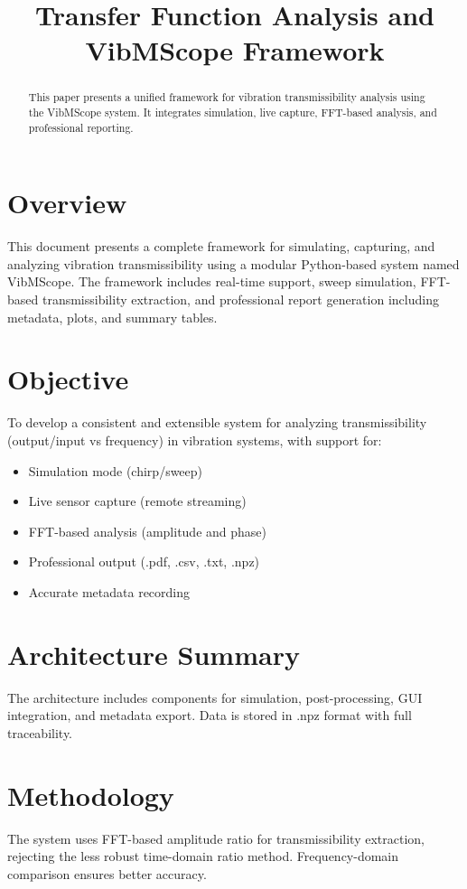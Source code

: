 \documentclass[conference]{IEEEtran}
\title{Transfer Function Analysis and VibMScope Framework}
\author{\IEEEauthorblockN{Author Name(s)}
\IEEEauthorblockA{Affiliation\\ Email}}
\begin{document}
\maketitle

\begin{abstract}
This paper presents a unified framework for vibration transmissibility analysis using the VibMScope system. It integrates simulation, live capture, FFT-based analysis, and professional reporting.
\end{abstract}

\section{Overview}
This document presents a complete framework for simulating, capturing, and analyzing vibration transmissibility using a modular Python-based system named VibMScope. The framework includes real-time support, sweep simulation, FFT-based transmissibility extraction, and professional report generation including metadata, plots, and summary tables.

\section{Objective}
To develop a consistent and extensible system for analyzing transmissibility (output/input vs frequency) in vibration systems, with support for:
\begin{itemize}
\item Simulation mode (chirp/sweep)
\item Live sensor capture (remote streaming)
\item FFT-based analysis (amplitude and phase)
\item Professional output (.pdf, .csv, .txt, .npz)
\item Accurate metadata recording
\end{itemize}

\section{Architecture Summary}
The architecture includes components for simulation, post-processing, GUI integration, and metadata export. Data is stored in .npz format with full traceability.

\section{Methodology}
The system uses FFT-based amplitude ratio for transmissibility extraction, rejecting the less robust time-domain ratio method. Frequency-domain comparison ensures better accuracy.
\end{document}
